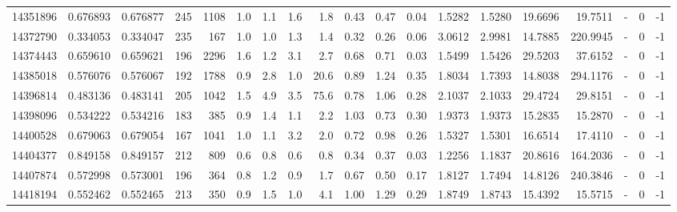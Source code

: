 \begin{tabular}{rrrrrrrrrrrrrrrrlrr}
  14351896 & 0.676893 &   0.676877 &  245 & 1108 &      1.0 &      1.1 &     1.6 &      1.8 &       0.43 &        0.47 &        0.04 &  1.5282 &  1.5280 &   19.6696 &   19.7511 &             - &        0 &         -1 \\
  14372790 & 0.334053 &   0.334047 &  235 &  167 &      1.0 &      1.0 &     1.3 &      1.4 &       0.32 &        0.26 &        0.06 &  3.0612 &  2.9981 &   14.7885 &  220.9945 &             - &        0 &         -1 \\
  14374443 & 0.659610 &   0.659621 &  196 & 2296 &      1.6 &      1.2 &     3.1 &      2.7 &       0.68 &        0.71 &        0.03 &  1.5499 &  1.5426 &   29.5203 &   37.6152 &             - &        0 &         -1 \\
  14385018 & 0.576076 &   0.576067 &  192 & 1788 &      0.9 &      2.8 &     1.0 &     20.6 &       0.89 &        1.24 &        0.35 &  1.8034 &  1.7393 &   14.8038 &  294.1176 &             - &        0 &         -1 \\
  14396814 & 0.483136 &   0.483141 &  205 & 1042 &      1.5 &      4.9 &     3.5 &     75.6 &       0.78 &        1.06 &        0.28 &  2.1037 &  2.1033 &   29.4724 &   29.8151 &             - &        0 &         -1 \\
  14398096 & 0.534222 &   0.534216 &  183 &  385 &      0.9 &      1.4 &     1.1 &      2.2 &       1.03 &        0.73 &        0.30 &  1.9373 &  1.9373 &   15.2835 &   15.2870 &             - &        0 &         -1 \\
  14400528 & 0.679063 &   0.679054 &  167 & 1041 &      1.0 &      1.1 &     3.2 &      2.0 &       0.72 &        0.98 &        0.26 &  1.5327 &  1.5301 &   16.6514 &   17.4110 &             - &        0 &         -1 \\
  14404377 & 0.849158 &   0.849157 &  212 &  809 &      0.6 &      0.8 &     0.6 &      0.8 &       0.34 &        0.37 &        0.03 &  1.2256 &  1.1837 &   20.8616 &  164.2036 &             - &        0 &         -1 \\
  14407874 & 0.572998 &   0.573001 &  196 &  364 &      0.8 &      1.2 &     0.9 &      1.7 &       0.67 &        0.50 &        0.17 &  1.8127 &  1.7494 &   14.8126 &  240.3846 &             - &        0 &         -1 \\
  14418194 & 0.552462 &   0.552465 &  213 &  350 &      0.9 &      1.5 &     1.0 &      4.1 &       1.00 &        1.29 &        0.29 &  1.8749 &  1.8743 &   15.4392 &   15.5715 &             - &        0 &         -1 \\

\end{tabular}

